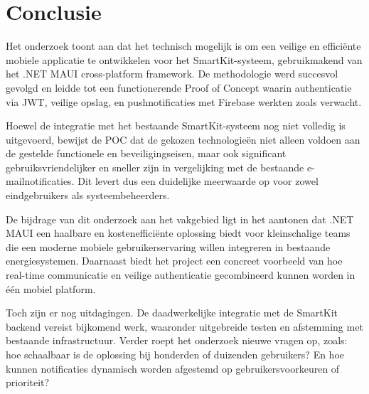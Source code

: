 
\chapter{Conclusie}%
\label{ch:conclusie}


Het onderzoek toont aan dat het technisch mogelijk is om een veilige en efficiënte mobiele applicatie te ontwikkelen voor het SmartKit-systeem, gebruikmakend van het .NET MAUI cross-platform framework. De methodologie werd succesvol gevolgd en leidde tot een functionerende Proof of Concept waarin authenticatie via JWT, veilige opslag, en pushnotificaties met Firebase werkten zoals verwacht.

Hoewel de integratie met het bestaande SmartKit-systeem nog niet volledig is uitgevoerd, bewijst de POC dat de gekozen technologieën niet alleen voldoen aan de gestelde functionele en beveiligingseisen, maar ook significant gebruiksvriendelijker en sneller zijn in vergelijking met de bestaande e-mailnotificaties. Dit levert dus een duidelijke meerwaarde op voor zowel eindgebruikers als systeembeheerders.

De bijdrage van dit onderzoek aan het vakgebied ligt in het aantonen dat .NET MAUI een haalbare en kostenefficiënte oplossing biedt voor kleinschalige teams die een moderne mobiele gebruikerservaring willen integreren in bestaande energiesystemen. Daarnaast biedt het project een concreet voorbeeld van hoe real-time communicatie en veilige authenticatie gecombineerd kunnen worden in één mobiel platform.

Toch zijn er nog uitdagingen. De daadwerkelijke integratie met de SmartKit backend vereist bijkomend werk, waaronder uitgebreide testen en afstemming met bestaande infrastructuur. Verder roept het onderzoek nieuwe vragen op, zoals: hoe schaalbaar is de oplossing bij honderden of duizenden gebruikers? En hoe kunnen notificaties dynamisch worden afgestemd op gebruikersvoorkeuren of prioriteit?

